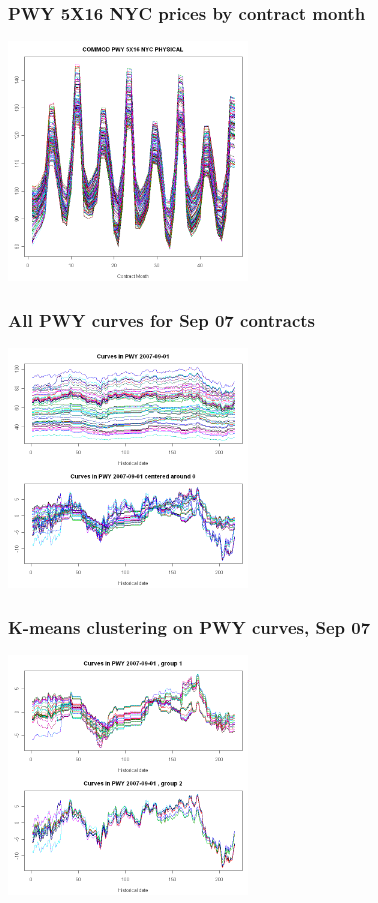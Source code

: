 \documentclass[10pt]{beamer}
\begin{document}
\frame
{
  \frametitle{PWY 5X16 NYC  prices by contract month}

\begin{center}
  \includegraphics[height=2.5in]{figures/pwy02.png}
\end{center}
}

\frame
{
  \frametitle{All PWY curves for Sep 07 contracts}

\begin{center}
  \includegraphics[height=2.5in]{figures/pwy-contract.png}
\end{center}
}

\frame
{
  \frametitle{K-means clustering on PWY curves, Sep 07}

\begin{center}
  \includegraphics[height=2.5in]{figures/pwy-kmeans.png}
\end{center}
}
\end{document}

